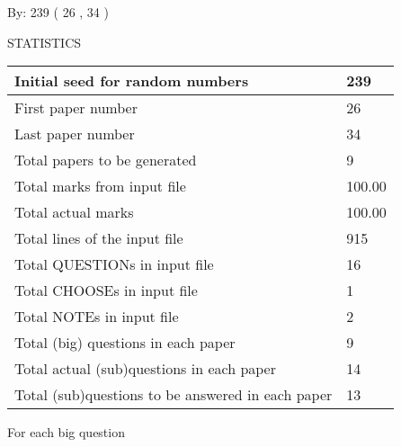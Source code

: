 \documentclass[12pt]{article}
\begin{document}
   
\hspace{1.0in} By: 
         239 (          26 ,           34 )
   
   
   
\vspace{0.2in}
\vspace{0.2in}
   
   
 \newpage
\setcounter{page}{1} 
   
   
 {\LARGE{STATISTICS}}
   
\vspace{0.2in}
   
 \begin{tabular}{|l|l|}
 \hline
 Initial seed for random numbers &         239  \\
\hline
 First paper number &          26  \\
\hline
 Last  paper number &          34  \\
\hline
 Total papers to be generated &           9  \\
\hline
Total marks from input file & 100.00 \\
\hline
Total actual marks & 100.00 \\
\hline
 Total lines of the input file &         915  \\
 \hline
 Total QUESTIONs in input file &          16  \\
\hline
 Total CHOOSEs in input file &           1  \\
\hline
 Total NOTEs in input file &           2  \\
\hline
 Total (big) questions in each paper &           9  \\
\hline
 Total actual (sub)questions in each paper &          14  \\
\hline
 Total (sub)questions to be answered in each paper &          13  \\
\hline
 \end{tabular}
   
   
 \newpage
   
{\LARGE{For each big question}}
   
   
\vspace{0.2in}
   
\end{document}
